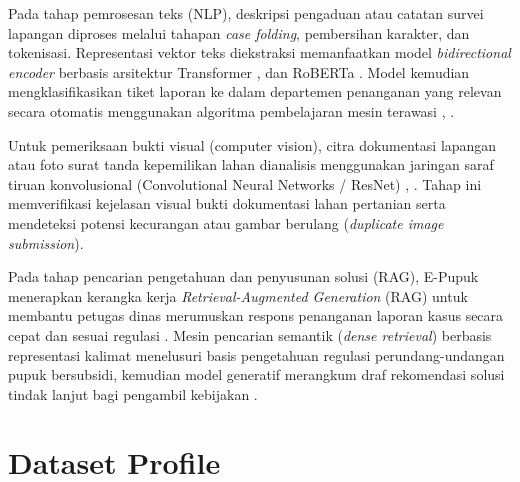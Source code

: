 ﻿\documentclass[conference]{IEEEtran}
\begin{document}
Pada tahap pemrosesan teks (NLP), deskripsi pengaduan atau catatan survei lapangan diproses melalui tahapan \textit{case folding}, pembersihan karakter, dan tokenisasi. Representasi vektor teks diekstraksi memanfaatkan model \textit{bidirectional encoder} berbasis arsitektur Transformer \cite{b3}, \cite{b4} dan RoBERTa \cite{b9}. Model kemudian mengklasifikasikan tiket laporan ke dalam departemen penanganan yang relevan secara otomatis menggunakan algoritma pembelajaran mesin terawasi \cite{b8}, \cite{b17}.

Untuk pemeriksaan bukti visual (computer vision), citra dokumentasi lapangan atau foto surat tanda kepemilikan lahan dianalisis menggunakan jaringan saraf tiruan konvolusional (Convolutional Neural Networks / ResNet) \cite{b6}, \cite{b7}. Tahap ini memverifikasi kejelasan visual bukti dokumentasi lahan pertanian serta mendeteksi potensi kecurangan atau gambar berulang (\textit{duplicate image submission}).

Pada tahap pencarian pengetahuan dan penyusunan solusi (RAG), E-Pupuk menerapkan kerangka kerja \textit{Retrieval-Augmented Generation} (RAG) untuk membantu petugas dinas merumuskan respons penanganan laporan kasus secara cepat dan sesuai regulasi \cite{b11}. Mesin pencarian semantik (\textit{dense retrieval}) berbasis representasi kalimat \cite{b10} menelusuri basis pengetahuan regulasi perundang-undangan pupuk bersubsidi, kemudian model generatif merangkum draf rekomendasi solusi tindak lanjut bagi pengambil kebijakan \cite{b5}.

\section{Dataset Profile}
\label{sec:dataset_profile}
\end{document}
